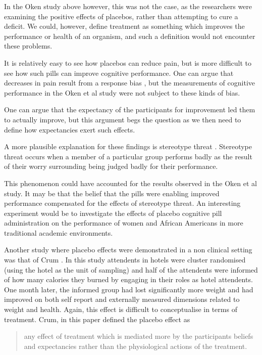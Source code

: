 In the Oken study above however, this was not the case, as the researchers were examining the positive effects of placebos, rather than attempting to cure a deficit. We could, however, define treatment as something which improves the performance or health of an organism, and such a definition would not encounter these problems.

It is relatively easy to see how placebos can reduce pain, but is more difficult to see how such pills can improve cognitive performance. One can argue that decreases in pain result from a response bias \cite{Allan2002}, but the measurements of cognitive performance in the Oken et al study were not subject to these kinds of bias. 

 One can argue that the expectancy of the participants for improvement led them to actually improve, but this argument begs the question as we then need to define how expectancies exert such effects. 

A more plausible explanation for these findings is stereotype threat \cite{schmader2003converging,spencerclaude1999stereotype}. Stereotype threat occurs when a member of a particular group performs badly as the result of their worry surrounding being judged badly for their performance. 

This phenomenon could have accounted for the results observed in the Oken et al study.  It may be that the belief that the pills were enabling improved performance compensated for the effects of stereotype threat. An interesting experiment would be to investigate the effects of placebo cognitive pill administration on the performance of women and African Americans in more traditional academic environments.  

Another study where placebo effects were demonstrated in a non clinical setting was that of Crum \cite{Crum2007}. In this study attendents in hotels were cluster randomised (using the hotel as the unit of sampling) and half of the attendents were informed of how many calories they burned by engaging in their roles as hotel attendents. One month later, the informed group had lost significantly more weight and had improved on both self report and externally measured dimensions related to weight and health. Again, this effect is difficult to conceptualise in terms of treatment.  Crum, in this paper defined the placebo effect as

\begin{quotation}
  any effect of treatment which is mediated more by the participants
  beliefs and expectancies rather than the physiological actions of
  the treatment.
\end{quotation}


